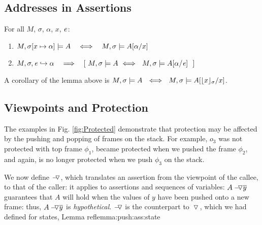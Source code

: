{ \subsection{Addresses in Assertions}

\begin{lemma}
\label{lemma:addr:expr}
For all $M$, $\sigma$, $\alpha$, $x$, $\re$:

\begin{enumerate}
\item
$ \satisfiesA{M}{\sigma[x\mapsto \alpha]}{A}   \ \ \ \Longleftrightarrow\ \ \ \satisfiesA{M}{\sigma}{A[\alpha/x]} $ 
\item
$\eval{M}{\sigma}{{\re}}{\alpha}  \ \ \ \Longrightarrow\ \ \  [ \ \satisfiesA{M}{\sigma}{A} \  \Longleftrightarrow\   \  \satisfiesA{M}{\sigma}{A[\alpha/\re]} \  \  ]$
\end{enumerate}

\end{lemma}

A corollary of the lemma above is $\satisfiesA{M}{\sigma}{A}  \ \ \Longleftrightarrow  \ \   \satisfiesA{M}{\sigma}{A[{\interpret \sigma x}/x]}$.

   
 \subsection{Viewpoints and Protection}
 
 
{The examples in Fig. \ref{fig:Protected} demonstrate that %
 protection may be affected by the pushing and popping of frames on the stack. For example, $o_3$ was not protected with top frame $\phi_1$,   became protected when we pushed the frame $\phi_2$,  and again, is no longer protected when we push $\phi_3$ on the stack. 
 
We now define 
$\pushSymbolAA$, which translates an assertion from the viewpoint of the callee, to that of the caller:
it applies to assertions and sequences of variables:  $\PushAS y A$   guarantees that $A$ will hold when the values of $y$ have been pushed onto a new frame:
 thus, $\PushAS y A$ is \emph{hypothetical}.
$\pushSymbolAA$ is the counterpart to $\pushSymbol$, which we had defined for states, \cf Lemma ref{lemma:push:ass:state}


}}
